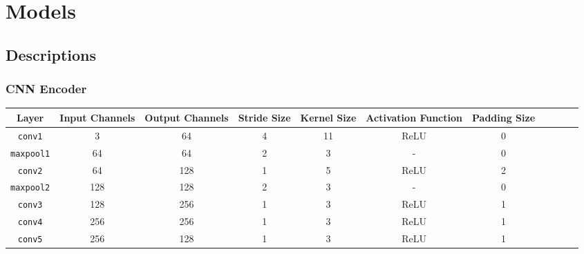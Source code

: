 \documentclass{article}
\begin{document}
    \section{Models}

    \subsection{Descriptions}

    \subsubsection{CNN Encoder}
    \begin{table}[H]
        \begin{tabular}{|c|c|c|c|c|c|c|c|c|c|c|}
            \hline
            Layer             & Input Channels & Output Channels & Stride Size & Kernel Size & Activation Function & Padding Size\\

            \hline
            \texttt{conv1}    & 3              & 64              & 4           & 11          & ReLU                & 0            \\

            \hline
            \texttt{maxpool1} & 64             & 64              & 2           & 3           & -                   & 0            \\

            \hline
            \texttt{conv2}    & 64             & 128             & 1           & 5           & ReLU                & 2            \\

            \hline
            \texttt{maxpool2} & 128            & 128             & 2           & 3           & -                   & 0            \\

            \hline
            \texttt{conv3}    & 128            & 256             & 1           & 3           & ReLU                & 1            \\

            \hline
            \texttt{conv4}    & 256            & 256             & 1           & 3           & ReLU                & 1            \\

            \hline
            \texttt{conv5}    & 256            & 128             & 1           & 3           & ReLU                & 1            \\


\end{tabular}
\end{table}
\end{document}
